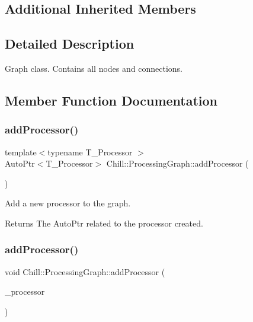 \subsection*{Additional Inherited Members}


\subsection{Detailed Description}
Graph class. Contains all nodes and connections. 

\subsection{Member Function Documentation}
\mbox{\label{class_chill_1_1_processing_graph_aa3bd2de51d11a08d4de2f0230f7b65d4}} 
\subsubsection{\texorpdfstring{add\+Processor()}{addProcessor()}\hspace{0.1cm}{\footnotesize\ttfamily [1/2]}}
{\footnotesize\ttfamily template$<$typename T\+\_\+\+Processor $>$ \\
Auto\+Ptr$<$T\+\_\+\+Processor$>$ Chill\+::\+Processing\+Graph\+::add\+Processor (\begin{DoxyParamCaption}{ }\end{DoxyParamCaption})\hspace{0.3cm}{\ttfamily [inline]}}

Add a new processor to the graph. \begin{DoxyReturn}{Returns}
The Auto\+Ptr related to the processor created. 
\end{DoxyReturn}
\mbox{\label{class_chill_1_1_processing_graph_a066ca6f9163fe4742254b9e6e7ccc857}} 
\subsubsection{\texorpdfstring{add\+Processor()}{addProcessor()}\hspace{0.1cm}{\footnotesize\ttfamily [2/2]}}
{\footnotesize\ttfamily void Chill\+::\+Processing\+Graph\+::add\+Processor (\begin{DoxyParamCaption}\item[{Auto\+Ptr$<$ \mbox{\hyperlink{class_chill_1_1_processor}{Processor}} $>$}]{\+\_\+processor }\end{DoxyParamCaption})\hspace{0.3cm}{\ttfamily [inline]}}

